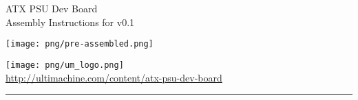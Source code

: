 \documentclass{article}
\newcommand{\HRule}[1]{\hfill \rule{0.2\linewidth}{#1}} %
\begin{document}
\begin{titlepage}

  {\Huge ATX PSU Dev Board }\\
  {\Large Assembly Instructions for v0.1} 
  \vspace*{\fill}	
  \begin{center}
  \texttt{[image: png/pre-assembled.png]}
  \end{center}
  \vspace*{\fill}

  \vfill
  {\centering \large 
  \hfill \texttt{[image: png/um\_logo.png]} \\
  \hfill \url{http://ultimachine.com/content/atx-psu-dev-board} \\

  \HRule{1pt}} %
\end{titlepage}

\clearpage %

\tableofcontents
\clearpage


\end{document}
